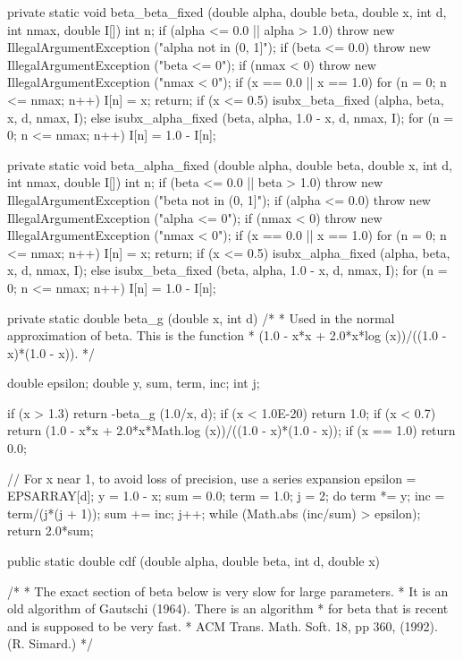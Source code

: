 \begin{code}
\begin{hide}
   private static void beta_beta_fixed (double alpha, double beta,
           double x, int d, int nmax, double I[])
   {
      int n;
      if (alpha <= 0.0 || alpha > 1.0)
        throw new IllegalArgumentException ("alpha not in (0, 1]");
      if (beta <= 0.0)
        throw new IllegalArgumentException ("beta <= 0");
      if (nmax < 0)
        throw new IllegalArgumentException ("nmax < 0");
      if (x == 0.0 || x == 1.0) {
         for (n = 0; n <= nmax; n++)
            I[n] = x;
         return;
      }
      if (x <= 0.5)
         isubx_beta_fixed (alpha, beta, x, d, nmax, I);
      else {
         isubx_alpha_fixed (beta, alpha, 1.0 - x, d, nmax, I);
         for (n = 0; n <= nmax; n++)
            I[n] = 1.0 - I[n];
      }
  }

   private static void beta_alpha_fixed (double alpha, double beta,
           double x, int d, int nmax, double I[])
   {
      int n;
      if (beta <= 0.0 || beta > 1.0)
        throw new IllegalArgumentException ("beta not in (0, 1]");
      if (alpha <= 0.0)
        throw new IllegalArgumentException ("alpha <= 0");
      if (nmax < 0)
        throw new IllegalArgumentException ("nmax < 0");
      if (x == 0.0 || x == 1.0) {
         for (n = 0; n <= nmax; n++)
            I[n] = x;
         return;
      }
      if (x <= 0.5)
         isubx_alpha_fixed (alpha, beta, x, d, nmax, I);
      else {
         isubx_beta_fixed (beta, alpha, 1.0 - x, d, nmax, I);
         for (n = 0; n <= nmax; n++)
            I[n] = 1.0 - I[n];
      }
   }

   private static double beta_g (double x, int d)
   /*
    * Used in the normal approximation of beta. This is the function
    * (1.0 - x*x + 2.0*x*log (x))/((1.0 - x)*(1.0 - x)).
    */
   {
      double epsilon;
      double y, sum, term, inc;
      int j;

      if (x > 1.3)
         return -beta_g (1.0/x, d);
      if (x < 1.0E-20)
         return 1.0;
      if (x < 0.7)
         return (1.0 - x*x + 2.0*x*Math.log (x))/((1.0 - x)*(1.0 - x));
      if (x == 1.0)
         return 0.0;

      // For x near 1, to avoid loss of precision, use a series expansion
      epsilon = EPSARRAY[d];
      y = 1.0 - x;
      sum = 0.0;
      term = 1.0;
      j = 2;
      do {
         term *= y;
         inc = term/(j*(j + 1));
         sum += inc;
         j++;
      } while (Math.abs (inc/sum) > epsilon);
      return 2.0*sum;
   }\end{hide}

   public static double cdf (double alpha, double beta, int d, double x)\begin{hide} {
   /*
    * The exact section of beta below is very slow for large parameters.
    * It is an old algorithm of Gautschi (1964). There is an algorithm
    * for beta that is recent and is supposed to be very fast.
    * ACM Trans. Math. Soft. 18, pp 360, (1992).  (R. Simard.)
    */

}
\end{hide}
\end{code}
